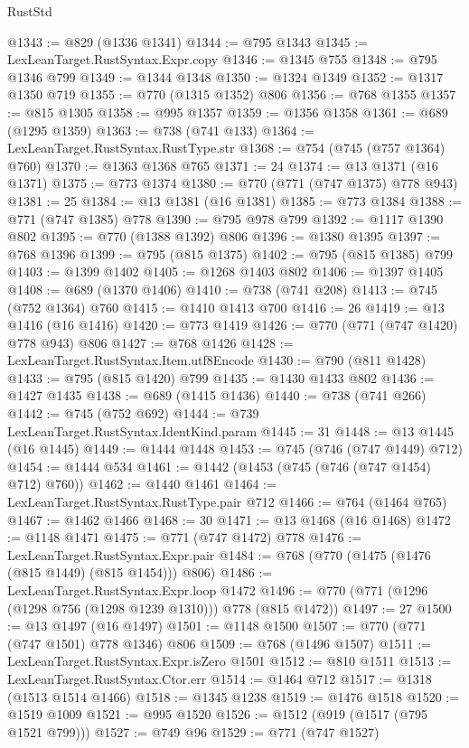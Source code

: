 \begin{lexlean}{RustStd}
\begin{coremodule}
{\begin{coremodule}
{{{{{{{{{{{{{{{@1343 := @829 (@1336 @1341)
@1344 := @795 @1343
@1345 := LexLeanTarget.RustSyntax.Expr.copy
@1346 := @1345 @755
@1348 := @795 @1346 @799
@1349 := @1344 @1348
@1350 := @1324 @1349
@1352 := @1317 @1350 @719
@1355 := @770 (@1315 @1352) @806
@1356 := @768 @1355
@1357 := @815 @1305
@1358 := @995 @1357
@1359 := @1356 @1358
@1361 := @689 (@1295 @1359)
@1363 := @738 (@741 @133)
@1364 := LexLeanTarget.RustSyntax.RustType.str
@1368 := @754 (@745 (@757 @1364) @760)
@1370 := @1363 @1368 @765
@1371 := 24
@1374 := @13 @1371 (@16 @1371)
@1375 := @773 @1374
@1380 := @770 (@771 (@747 @1375) @778 @943)
@1381 := 25
@1384 := @13 @1381 (@16 @1381)
@1385 := @773 @1384
@1388 := @771 (@747 @1385) @778
@1390 := @795 @978 @799
@1392 := @1117 @1390 @802
@1395 := @770 (@1388 @1392) @806
@1396 := @1380 @1395
@1397 := @768 @1396
@1399 := @795 (@815 @1375)
@1402 := @795 (@815 @1385) @799
@1403 := @1399 @1402
@1405 := @1268 @1403 @802
@1406 := @1397 @1405
@1408 := @689 (@1370 @1406)
@1410 := @738 (@741 @208)
@1413 := @745 (@752 @1364) @760
@1415 := @1410 @1413 @700
@1416 := 26
@1419 := @13 @1416 (@16 @1416)
@1420 := @773 @1419
@1426 := @770 (@771 (@747 @1420) @778 @943) @806
@1427 := @768 @1426
@1428 := LexLeanTarget.RustSyntax.Item.utf8Encode
@1430 := @790 (@811 @1428)
@1433 := @795 (@815 @1420) @799
@1435 := @1430 @1433 @802
@1436 := @1427 @1435
@1438 := @689 (@1415 @1436)
@1440 := @738 (@741 @266)
@1442 := @745 (@752 @692)
@1444 := @739 LexLeanTarget.RustSyntax.IdentKind.param
@1445 := 31
@1448 := @13 @1445 (@16 @1445)
@1449 := @1444 @1448
@1453 := @745 (@746 (@747 @1449) @712)
@1454 := @1444 @534
@1461 := @1442 (@1453 (@745 (@746 (@747 @1454) @712) @760))
@1462 := @1440 @1461
@1464 := LexLeanTarget.RustSyntax.RustType.pair @712
@1466 := @764 (@1464 @765)
@1467 := @1462 @1466
@1468 := 30
@1471 := @13 @1468 (@16 @1468)
@1472 := @1148 @1471
@1475 := @771 (@747 @1472) @778
@1476 := LexLeanTarget.RustSyntax.Expr.pair
@1484 := @768 (@770 (@1475 (@1476 (@815 @1449) (@815 @1454))) @806)
@1486 := LexLeanTarget.RustSyntax.Expr.loop @1472
@1496 := @770 (@771 (@1296 (@1298 @756 (@1298 @1239 @1310))) @778 (@815 @1472))
@1497 := 27
@1500 := @13 @1497 (@16 @1497)
@1501 := @1148 @1500
@1507 := @770 (@771 (@747 @1501) @778 @1346) @806
@1509 := @768 (@1496 @1507)
@1511 := LexLeanTarget.RustSyntax.Expr.isZero @1501
@1512 := @810 @1511
@1513 := LexLeanTarget.RustSyntax.Ctor.err
@1514 := @1464 @712
@1517 := @1318 (@1513 @1514 @1466)
@1518 := @1345 @1238
@1519 := @1476 @1518
@1520 := @1519 @1009
@1521 := @995 @1520
@1526 := @1512 (@919 (@1517 (@795 @1521 @799)))
@1527 := @749 @96
@1529 := @771 (@747 @1527)
}}}}}}}}}}}}}}}
\end{coremodule}}
\end{coremodule}
\end{lexlean}
